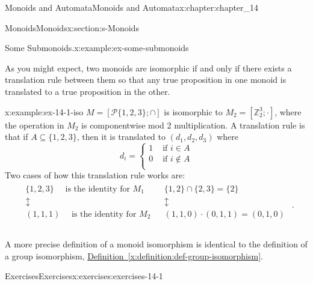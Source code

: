 \documentclass[oneside,10pt,]{book}
\newcommand{\xreffont}{\relax}
\numberwithin{equation}{section}
\begin{document}
\begin{chapterptx}{Monoids and Automata}{}{Monoids and Automata}{}{}{x:chapter:chapter_14}
\begin{sectionptx}{Monoids}{}{Monoids}{}{}{x:section:s-Monoids}
\begin{example}{Some Submonoids.}{x:example:ex-some-submonoids}
\begin{enumerate}[label=(\alph*)]
\end{enumerate}
%
\end{example}
As you might expect, two monoids are isomorphic if and only if there exists a translation rule between them so that any true proposition in one monoid is translated to a true proposition in the other.%
\begin{example}{}{x:example:ex-14-1-iso}%
\(M=[\mathcal{P}\{1,2,3\};\cap  ]\) is isomorphic to \(M_2=\left[\mathbb{Z}_2^3;\cdot \right]\), where the operation in \(M_2\) is componentwise mod 2 multiplication. A translation rule is that if \(A\subseteq \{1,2,3\}\), then it is translated to \(\left(d_1,d_2,d_3\right)\) where%
\begin{equation*}
d_i=\left\{
\begin{array}{cc}
1 & \textrm{ if } i\in A \\
0 & \textrm{ if } i\notin A \\
\end{array}
\right.
\end{equation*}
Two cases of how this translation rule works are:%
\begin{equation*}
\begin{array}{lr}
\begin{array}{c}
\{1, 2, 3\}\quad\textrm{ is the identity for } M_1\\
\updownarrow   \\
(1,1,1) \quad\textrm{ is the identity for }M_2\\
\end{array} 
&     
\begin{array}{c}
\{1, 2\}\cap \{ 2, 3\}=\{2\}\\
\updownarrow \\       
(1, 1, 0) \cdot  (0, 1, 1) = (0, 1, 0)\\
\end{array}\\
\quad
\end{array}\text{.}
\end{equation*}
%
\end{example}
A more precise definition of a monoid isomorphism is identical to the definition of a group isomorphism, \hyperref[x:definition:def-group-isomorphism]{Definition~{\xreffont\ref{x:definition:def-group-isomorphism}}}.%
%
%
\typeout{************************************************}
\typeout{************************************************}
%
\begin{exercises-subsection}{Exercises}{}{Exercises}{}{}{x:exercises:exercises-14-1}

\end{exercises-subsection}
\end{sectionptx}
\end{chapterptx}
\end{document}
